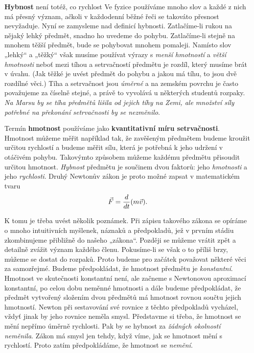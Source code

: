 {    \textbf{Hybnost} není totéž, co rychlost Ve fyzice používáme mnoho slov a každé z nich má 
    přesný význam, ačkoli v každodenní běžné řeči se takováto přesnost nevyžaduje. Nyní se 
    zamysleme nad definicí hybnosti. Zatlačíme-li rukou na nějaký lehký předmět, snadno ho uvedeme 
    do pohybu. Zatlačíme-li stejně na mnohem těžší předmět, bude se pohybovat mnohem pomaleji. 
    Namísto slov „lehký“ a „těžký“ však musíme používat výrazy s \emph{menší hmotností} a 
    \emph{větší hmotnosti} neboť mezi tíhou a setrvačností předmětu je rozdíl, který musíme brát v 
    úvahu. (Jak těžké je uvést předmět do pohybu a jakou má tíhu, to jsou dvě rozdílné věci.) Tíha 
    a setrvačnost jsou \emph{úměrné} a na zemském povrchu je často považujeme za číselně stejné, a 
    právě to vyvolává u některých studentů rozpaky. \emph{Na Marsu by se tíha předmětů lišila od 
    jejich tíhy na Zemi, ale množství síly potřebné na překonání setrvačnosti by se nezměnilo}.
    
    Termín \textbf{hmotnost} používáme jako \textbf{kvantitativní míru setrvačnosti}. Hmotnost 
    můžeme měřit například tak, že zavěšeným předmětem budeme kroužit určitou rychlostí a budeme 
    měřit sílu, která je potřebná k jeho udržení v otáčivém pohybu. Takovýmto způsobem můžeme 
    každému předmětu přisoudit určitou hmotnost. \emph{Hybnost} předmětu je součinem dvou faktorů: 
    jeho \emph{hmotnosti} a jeho \emph{rychlosti}. Druhý Newtonův zákon je proto možné zapsat v 
    matematickém tvaru
    \begin{equation}\label{fyz:eq052}
      \vec{F} = \frac{d }{d t}(m\vec{v}).
    \end{equation}
    
    K tomu je třeba uvést několik poznámek. Při zápisu takového zákona se opíráme o mnoho 
    intuitivních myšlenek, náznaků a předpokladů, jež v prvním stádiu zkombinujeme přibližně do 
    našeho „zákona“. Později se můžeme vrátit zpět a detailně zvážit význam každého členu. 
    Pokusíme-li se však o to příliš brzy, můžeme se dostat do rozpaků. Proto budeme pro začátek 
    považovat některé věci za samozřejmé. Budeme předpokládat, že hmotnost předmětu je 
    \emph{konstantní}. Hmotnost ve skutečnosti konstantní není, ale začneme s Newtonovou aproximací 
    konstantní, po celou dobu neměnné hmotnosti a dále budeme předpokládat, že předmět vytvořený 
    složením dvou předmětů má hmotnost rovnou součtu jejich hmotností. Newton při sestavování své 
    rovnice z těchto předpokladů vycházel, vždyť jinak by jeho rovnice neměla smysl. Představme si 
    třeba, že hmotnost se mění nepřímo úměrně rychlosti. Pak by se hybnost za \emph{žádných 
    okolností neměnila}. Zákon má smysl jen tehdy, když víme, jak se hmotnost mění s rychlostí. 
    Proto zatím předpokládáme, že hmotnost se \emph{nemění}.
    
}
